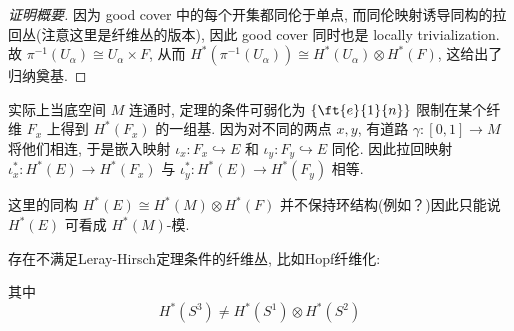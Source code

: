 \begin{proof}[证明概要]
        因为 good cover 中的每个开集都同伦于单点, 而同伦映射诱导同构的拉回丛(注意这里是纤维丛的版本), 因此 good cover 同时也是 locally trivialization.
        故 $\pi^{-1}(U_\alpha)\cong U_{\alpha}\times F$, 从而 $H^*(\pi^{-1}(U_\alpha))\cong H^*(U_{\alpha})\otimes H^*(F)$, 这给出了归纳奠基.
    \end{proof}
    \begin{remark}
        实际上当底空间 $M$ 连通时, 定理的条件可弱化为 $\{\ft{e}{1}{n}\}$ 限制在某个纤维 $F_x$ 上得到 $H^*(F_x)$ 的一组基. 
        因为对不同的两点 $x,y$, 有道路 $\gamma:[0,1]\rightarrow M$ 将他们相连, 于是嵌入映射 $\iota_x:F_x\hookrightarrow E$ 和 $\iota_y:F_y\hookrightarrow E$ 同伦.
        因此拉回映射 $\iota^*_x:H^*(E)\rightarrow H^*(F_x)$ 与 $\iota^*_y:H^*(E)\rightarrow H^*(F_y)$ 相等.
    \end{remark}
    \begin{remark}
        这里的同构 $H^*(E)\cong H^*(M)\otimes H^*(F)$ 并不保持环结构(例如？)因此只能说 $H^*(E)$ 可看成 $H^*(M)$-模.
    \end{remark}
    \begin{remark}
        存在不满足{\rm Leray-Hirsch}定理条件的纤维丛, 比如{\rm Hopf}纤维化:
        \begin{center}
        \end{center}
        其中
        \begin{equation*}
            H^*(S^3)\neq H^*(S^1)\otimes H^*(S^2)
        \end{equation*}
    \end{remark}